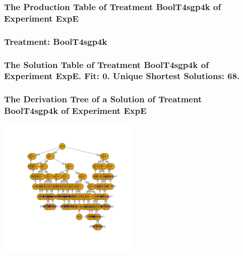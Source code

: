 \documentclass[18pt,c]{beamer}
\begin{document}
 \begin{frame}
 \fontsize{8pt}{9pt}\selectfont
 \frametitle{ The Production Table of Treatment BoolT4sgp4k of Experiment ExpE }

 \label{ExpEGrammarTable003.tex}  
 \end{frame}

 \begin{frame}
 \fontsize{8pt}{9pt}\selectfont
 \frametitle{ Treatment: BoolT4sgp4k }

 \label{ExpEStatsTable005.tex}  
 \end{frame}

 \begin{frame}
 \fontsize{8pt}{9pt}\selectfont
 \frametitle{ The Solution Table of Treatment BoolT4sgp4k of Experiment ExpE. Fit: 0. Unique Shortest Solutions: 68. }

 \label{ExpESolutionTable002.tex}  
 \end{frame}

 \begin{frame}
 \frametitle{ The Derivation Tree of a Solution of Treatment BoolT4sgp4k of Experiment ExpE }
 \begin{center}
\includegraphics[width=0.5\textwidth, angle=0]
{ExpEDerivationTreeFigure002.pdf}
 \end{center}
 \label{report/ExpEDerivationTreeFigure002.pdf}  
 \end{frame}
\end{document}
